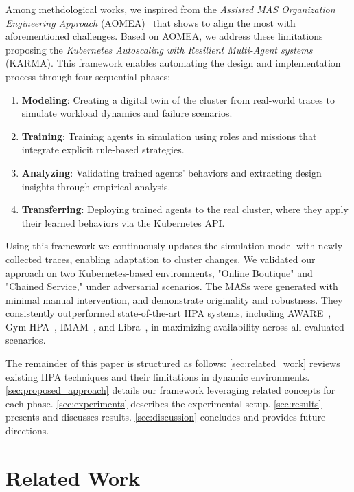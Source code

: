 \documentclass[conference]{IEEEtran}
\begin{document}
Among methdological works, we inspired from the \textit{Assisted MAS Organization Engineering Approach} (AOMEA)~\cite{soule2024aomea} that shows to align the most with aforementioned challenges. Based on AOMEA, we address these limitations proposing the \textit{Kubernetes Autoscaling with Resilient Multi-Agent systems} (KARMA). This framework enables automating the design and implementation process through four sequential phases:
\begin{enumerate}
    \item \textbf{Modeling}: Creating a digital twin of the cluster from real-world traces to simulate workload dynamics and failure scenarios.
    \item \textbf{Training}: Training agents in simulation using roles and missions that integrate explicit rule-based strategies.
    \item \textbf{Analyzing}: Validating trained agents' behaviors and extracting design insights through empirical analysis.
    \item \textbf{Transferring}: Deploying trained agents to the real cluster, where they apply their learned behaviors via the Kubernetes API.
\end{enumerate}

Using this framework we continuously updates the simulation model with newly collected traces, enabling adaptation to cluster changes. We validated our approach on two Kubernetes-based environments, "Online Boutique" and "Chained Service," under adversarial scenarios. The MASs were generated with minimal manual intervention, and demonstrate originality and robustness. They consistently outperformed state-of-the-art HPA systems, including AWARE~\cite{AWARE}, Gym-HPA~\cite{GymHPA}, IMAM~\cite{IMAM}, and Libra~\cite{Libra}, in maximizing availability across all evaluated scenarios.

The remainder of this paper is structured as follows:
\autoref{sec:related_work} reviews existing HPA techniques and their limitations in dynamic environments.
\autoref{sec:proposed_approach} details our framework leveraging related concepts for each phase.
\autoref{sec:experiments} describes the experimental setup.
\autoref{sec:results} presents and discusses results.
\autoref{sec:discussion} concludes and provides future directions.

\section{Related Work}
\label{sec:related_work}
\end{document}
